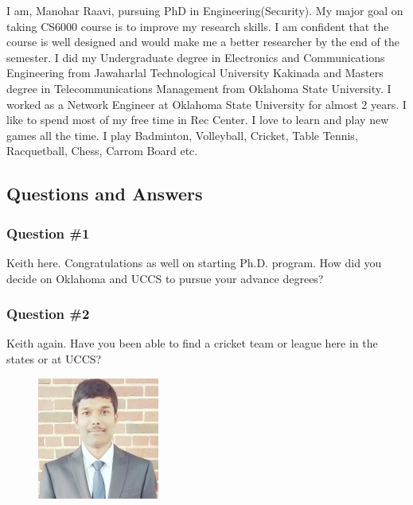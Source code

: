 
I am, Manohar Raavi, pursuing PhD in Engineering(Security). My major goal on taking CS6000 course is to improve my research skills. 
I am confident that the course is well designed and would make me a better researcher by the end of the semester.
 I did my Undergraduate degree in Electronics and Communications Engineering from Jawaharlal Technological University Kakinada and Masters degree in Telecommunications Management from Oklahoma State University. I worked as a Network Engineer at Oklahoma State University for almost 2 years. I like to spend most of my free time in Rec Center.
 I love to learn and play new games all the time. I play Badminton, Volleyball, Cricket, Table Tennis, Racquetball, Chess, Carrom Board etc.

\subsection{Questions and Answers}
\subsubsection {Question \#1}
Keith here. Congratulations as well on starting Ph.D. program. How did you decide on Oklahoma and UCCS to pursue your advance degrees?

\subsubsection {Question \#2}

Keith again.  Have you been able to find a cricket team or league here in the states or at UCCS?

\begin{figure}[htp]
    \centering
    \includegraphics[width=4cm]{linkd1}
\end{figure}

